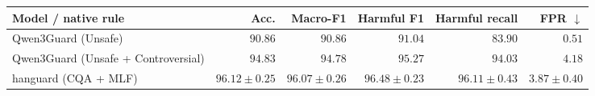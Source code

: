 \begin{tabular}{lrrrrr}
\toprule
Model / native rule & Acc. & Macro-F1 & Harmful F1 & Harmful recall & FPR $\downarrow$ \\
\midrule
Qwen3Guard (Unsafe) & $90.86$ & $90.86$ & $91.04$ & $83.90$ & $0.51$ \\
Qwen3Guard (Unsafe + Controversial) & $94.83$ & $94.78$ & $95.27$ & $94.03$ & $4.18$ \\
hanguard (CQA + MLF) & $96.12 \pm 0.25$ & $96.07 \pm 0.26$ & $96.48 \pm 0.23$ & $96.11 \pm 0.43$ & $3.87 \pm 0.40$ \\
\bottomrule
\end{tabular}
